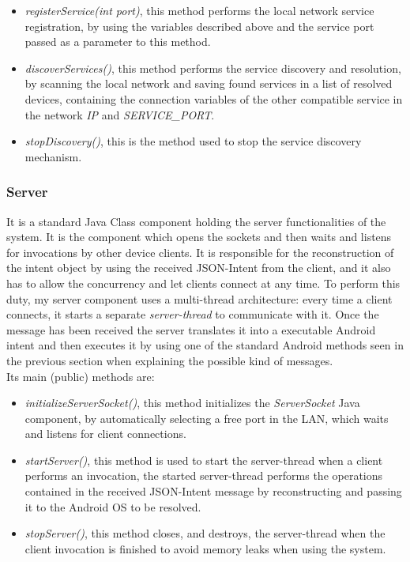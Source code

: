 \begin{itemize}
	\item \textit{registerService(int port)}, this method performs the local network service registration, by using the variables described above and the service port passed as a parameter to this method.
	\item \textit{discoverServices()}, this method performs the service discovery and resolution, by scanning the local network and saving found services in a list of resolved devices, containing the connection variables of the other compatible service in the network \textit{IP} and \textit{SERVICE\_PORT}.
	\item \textit{stopDiscovery()}, this is the method used to stop the service discovery mechanism.
\end{itemize}

\subsubsection{Server}
It is a standard Java Class component holding the server functionalities of the system. It is the component which opens the sockets and then waits and listens for invocations by other device clients. It is responsible for the reconstruction of the intent object by using the received JSON-Intent from the client, and it also has to allow the concurrency and let clients connect at any time.
To perform this duty, my server component uses a multi-thread architecture: every time a client connects, it starts a separate \textit{server-thread} to communicate with it. Once the message has been received the server translates it into a executable Android intent and then executes it by using one of the standard Android methods seen in the previous section when explaining the possible kind of messages.\\
Its main (public) methods are:
\begin{itemize}
	\item \textit{initializeServerSocket()}, this method initializes the \textit{ServerSocket} Java component, by automatically selecting a free port in the LAN, which waits and listens for client connections.
	\item \textit{startServer()}, this method is used to start the server-thread when a client performs an invocation, the started server-thread performs the operations contained in the received JSON-Intent message by reconstructing and passing it to the Android OS to be resolved.
	\item \textit{stopServer()}, this method closes, and destroys, the server-thread when the client invocation is finished to avoid memory leaks when using the system. 
\end{itemize}

